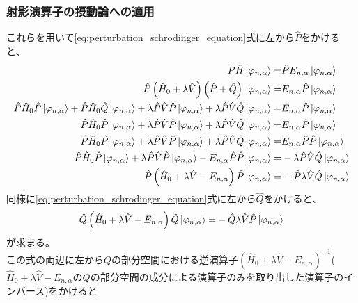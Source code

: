 \documentclass{ltjsarticle}
\begin{document}
\subsubsection{射影演算子の摂動論への適用}
これらを用いて\eqref{eq:perturbation_schrodinger_equation}式に左から$\hat{P}$をかけると、
\begin{align}
  \hat{P}\hat{H}\ket*{\varphi_{n,\alpha}}=&\hat{P}E_{n,\alpha}\ket*{\varphi_{n,\alpha}}\\
  \hat{P}\left( \hat{H}_0+\lambda\hat{V} \right) \left( \hat{P}+\hat{Q} \right) \ket*{\varphi_{n,\alpha}}=&E_{n,\alpha}\hat{P}\ket*{\varphi_{n,\alpha}}\\
  \hat{P}\hat{H}_0\hat{P}\ket*{\varphi_{n,\alpha}}+\hat{P}\hat{H}_0\hat{Q}\ket*{\varphi_{n,\alpha}}+\lambda\hat{P}\hat{V}\hat{P}\ket*{\varphi_{n,\alpha}}+\lambda\hat{P}\hat{V}\hat{Q}\ket*{\varphi_{n,\alpha}}=&E_{n,\alpha}\hat{P}\ket*{\varphi_{n,\alpha}}\\
  \hat{P}\hat{H}_0\hat{P}\ket*{\varphi_{n,\alpha}}+\lambda\hat{P}\hat{V}\hat{P}\ket*{\varphi_{n,\alpha}}+\lambda\hat{P}\hat{V}\hat{Q}\ket*{\varphi_{n,\alpha}}=&E_{n,\alpha}\hat{P}\ket*{\varphi_{n,\alpha}}\\
  \hat{P}\hat{H}_0\hat{P}\ket*{\varphi_{n,\alpha}}+\lambda\hat{P}\hat{V}\hat{P}\ket*{\varphi_{n,\alpha}}+\lambda\hat{P}\hat{V}\hat{Q}\ket*{\varphi_{n,\alpha}}=&E_{n,\alpha}\hat{P}\hat{P}\ket*{\varphi_{n,\alpha}}\\
  \hat{P}\hat{H}_0\hat{P}\ket*{\varphi_{n,\alpha}}+\lambda\hat{P}\hat{V}\hat{P}\ket*{\varphi_{n,\alpha}}-E_{n,\alpha}\hat{P}\hat{P}\ket*{\varphi_{n,\alpha}}=&-\lambda\hat{P}\hat{V}\hat{Q}\ket*{\varphi_{n,\alpha}}\\
  \hat{P}\left( \hat{H}_0+\lambda\hat{V}-E_{n,\alpha} \right)\hat{P}\ket*{\varphi_{n,\alpha}}=&-\hat{P}\lambda\hat{V}\hat{Q}\ket*{\varphi_{n,\alpha}}\\
  \label{eq:perturbation_p}
\end{align}
同様に\eqref{eq:perturbation_schrodinger_equation}式に左から$\hat{Q}$をかけると、
\begin{align}
  \hat{Q}\left( \hat{H}_0+\lambda\hat{V}-E_{n,\alpha} \right)\hat{Q}\ket*{\varphi_{n,\alpha}}=&-\hat{Q}\lambda\hat{V}\hat{P}\ket*{\varphi_{n,\alpha}}\\
\end{align}
が求まる。\\
この式の両辺に左から$Q$の部分空間における逆演算子$\left( \hat{H}_0+\lambda\hat{V}-E_{n,\alpha} \right)^{-1}$($\hat{H}_0+\lambda\hat{V}-E_{n,\alpha}$の$Q$の部分空間の成分による演算子のみを取り出した演算子のインバース)をかけると
\end{document}
